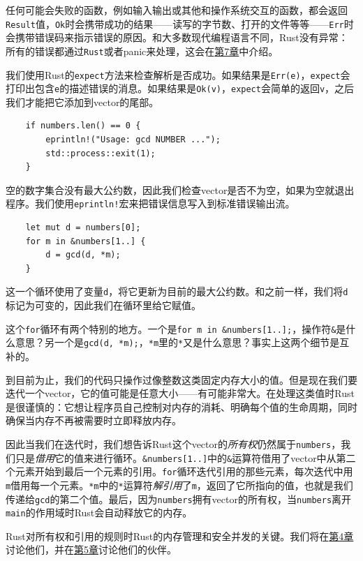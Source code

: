 任何可能会失败的函数，例如输入输出或其他和操作系统交互的函数，都会返回\texttt{Result}值，\texttt{Ok}时会携带成功的结果——读写的字节数、打开的文件等等——\texttt{Err}时会携带错误码来指示错误的原因。和大多数现代编程语言不同，Rust没有异常：所有的错误都通过\texttt{Rust}或者panic来处理，这会在\hyperref[ch07]{第7章}中介绍。

我们使用Rust的\texttt{expect}方法来检查解析是否成功。如果结果是\texttt{Err(e)}，\texttt{expect}会打印出包含\texttt{e}的描述错误的消息。如果结果是\texttt{Ok(v)}，\texttt{expect}会简单的返回\texttt{v}，之后我们才能把它添加到vector的尾部。

\begin{verbatim}
    if numbers.len() == 0 {
        eprintln!("Usage: gcd NUMBER ...");
        std::process::exit(1);
    }
\end{verbatim}

空的数字集合没有最大公约数，因此我们检查vector是否不为空，如果为空就退出程序。我们使用\texttt{eprintln!}宏来把错误信息写入到标准错误输出流。

\begin{verbatim}
    let mut d = numbers[0];
    for m in &numbers[1..] {
        d = gcd(d, *m);
    }
\end{verbatim}

这一个循环使用了变量\texttt{d}，将它更新为目前的最大公约数。和之前一样，我们将\texttt{d}标记为可变的，因此我们在循环里给它赋值。

这个\texttt{for}循环有两个特别的地方。一个是\texttt{for m in \&numbers[1..];}，操作符\texttt{\&}是什么意思？另一个是\texttt{gcd(d, *m);}，\texttt{*m}里的\texttt{*}又是什么意思？事实上这两个细节是互补的。

到目前为止，我们的代码只操作过像整数这类固定内存大小的值。但是现在我们要迭代一个vector，它的值可能是任意大小——有可能非常大。在处理这类值时Rust是很谨慎的：它想让程序员自己控制对内存的消耗、明确每个值的生命周期，同时确保当内存不再被需要时立即释放内存。

因此当我们在迭代时，我们想告诉Rust这个vector的\emph{所有权}仍然属于\texttt{numbers}，我们只是\emph{借用}它的值来进行循环。\texttt{\&numbers[1..]}中的\texttt{\&}运算符借用了vector中从第二个元素开始到最后一个元素的引用。\texttt{for}循环迭代引用的那些元素，每次迭代中用\texttt{m}借用每一个元素。\texttt{*m}中的\texttt{*}运算符\emph{解引用}了\texttt{m}，返回了它所指向的值，也就是我们传递给\texttt{gcd}的第二个值。最后，因为\texttt{numbers}拥有vector的所有权，当\texttt{numbers}离开\texttt{main}的作用域时Rust会自动释放它的内存。

Rust对所有权和引用的规则时Rust的内存管理和安全并发的关键。我们将在\hyperref[ch04]{第4章}讨论他们，并在\hyperref[ch05]{第5章}讨论他们的伙伴。

